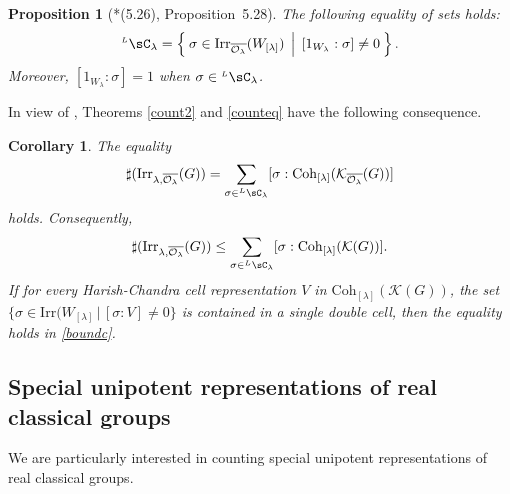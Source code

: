 \documentclass[12pt,a4paper]{amsart}
\def\subset{\subseteq}
\newcommand{\CK}{{\mathcal {K}}}
\newcommand{\CO}{{\mathcal {O}}}
\newcommand{\sgn}{\operatorname{sgn}}
\numberwithin{equation}{section}
\newtheorem{prop}[thm]{Proposition}
\newtheorem{cor}[thm]{Corollary}
\theoremstyle{remark}
\def\Irr{\mathrm{Irr}}
\def\LC{{}^{\scriptscriptstyle L}\sC}
\def\Coh{\mathrm{Coh}}
\newcommand{\Lam}{{[\lambda]}}
\begin{document}



 \begin{prop}[{\cite{BVUni}*{(5.26), Proposition~5.28}}]\label{lem:lcell.BV0}
  The following equality of sets holds:
   \[
     \LC_{\lambda} = \Set{\sigma\in \Irr_{\overline{\CO_\lambda}}(W_\Lam)\, |\,   [1_{W_{\lambda}}:\sigma]\neq 0}.
   \]
   Moreover, $[1_{W_{\lambda}}:\sigma]=1$ when
   $\sigma\in \LC_\lambda$.
 \end{prop}


In view of , Theorems \ref{count2} and \ref{counteq} have the following consequence.

 \begin{cor}
   \label{cor:bound} The equality
   \[
     \sharp(\Irr_{\lambda,\overline{\CO_\lambda}}(G)) =\sum_{\sigma\in \LC_\lambda} [\sigma: \Coh_{\Lam}(\CK_{\overline{\CO_\lambda}}(G))]
   \]
   holds.
   Consequently,
   \begin{equation}\label{boundc}
     \sharp(\Irr_{\lambda,\overline{\CO_\lambda}}(G)) \leq \sum_{\sigma\in \LC_\lambda} [\sigma: \Coh_{\Lam}(\CK(G))].
   \end{equation}
   If for every Harish-Chandra cell representation $V$  in $\Coh_{\Lam}(\CK(G))$, the set $\{\sigma\in \Irr(W_{[\lambda]}\,|\, [\sigma: V]\neq 0\}$ is contained in a single double cell, then the equality holds in
   \eqref{boundc}.

 \end{cor}


 \subsection{Special unipotent representations of real classical groups}
 \label{sec:defunip}

 We are particularly interested in counting special unipotent representations of
 real classical groups.
\end{document}

